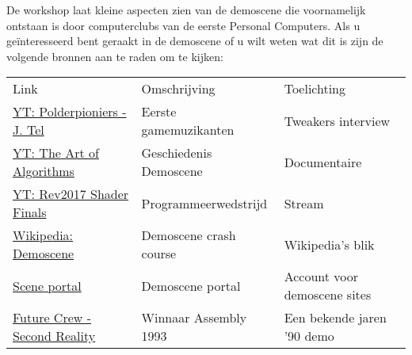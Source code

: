 \documentclass{article}
\begin{document}
De workshop laat kleine aspecten zien van de demoscene die voornamelijk ontstaan is door computerclubs van de eerste Personal Computers.
Als u ge\"interesseerd bent geraakt in de demoscene of u wilt weten wat dit is zijn de volgende bronnen aan te raden om te kijken:

\begin{tabular}{l|l|l}
Link & Omschrijving & Toelichting \\
\href{https://www.youtube.com/watch?v=AdTANxS-LHg}{YT: Polderpioniers - J. Tel} & Eerste gamemuzikanten & Tweakers interview \\
\href{https://www.youtube.com/watch?v=5MexnBunH_g}{YT: The Art of Algorithms} & Geschiedenis Demoscene & Documentaire \\
\href{https://www.youtube.com/watch?v=O-1zEo7DD8w}{YT: Rev2017 Shader Finals} & Programmeerwedstrijd & Stream \\
\href{https://en.wikipedia.org/wiki/Demoscene}{Wikipedia: Demoscene} & Demoscene crash course & Wikipedia's blik \\
\href{https://id.scene.org/}{Scene portal} & Demoscene portal & Account voor demoscene sites \\
\href{https://www.youtube.com/watch?v=rFv7mHTf0nA}{Future Crew - Second Reality} & Winnaar Assembly 1993 & Een bekende jaren '90 demo \\
\end{tabular}
\end{document}
